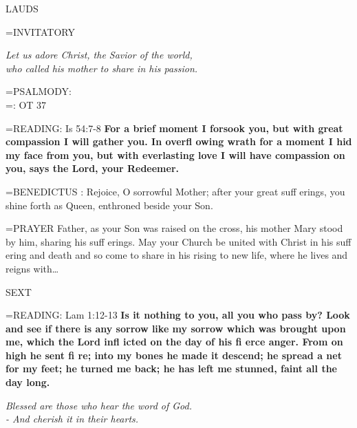 \begin{flushleft}\normalsize LAUDS\\\end{flushleft}

\hangindent=\parindent \small{INVITATORY}
\begin{center}
\textit{Let us adore Christ, the Savior of the world,\\}
\textit{who called his mother to share in his passion.\\}
\end{center}

\hangindent=\parindent \small{PSALMODY:}\\
\hangindent=\parindent : OT 37\vspace{0.5em}

\hangindent=\parindent \small{READING}: Is 54:7-8 \textbf{For a brief moment I forsook you, but with great
compassion I will gather you. In overfl owing wrath for a moment
I hid my face from you, but with everlasting love I will have
compassion on you, says the Lord, your Redeemer.\\}
 
\hangindent=\parindent \small{BENEDICTUS : Rejoice, O sorrowful Mother; after your great suff erings,
you shine forth as Queen, enthroned beside your Son.\\}
 
\hangindent=\parindent \small{PRAYER  Father, as your Son was raised on the cross, his mother Mary
stood by him, sharing his suff erings. May your Church be united
with Christ in his suff ering and death and so come to share in his
rising to new life, where he lives and reigns with…\\}
 
\begin{flushleft}\normalsize SEXT\\\end{flushleft}

\hangindent=\parindent \small{READING}: Lam 1:12-13 \textbf{Is it nothing to you, all you who pass by? Look
and see if there is any sorrow like my sorrow which was brought
upon me, which the Lord infl icted on the day of his fi erce anger.
From on high he sent fi re; into my bones he made it descend; he
spread a net for my feet; he turned me back; he has left me stunned,
faint all the day long.}
 
\begin{center}
\textit{Blessed are those who hear the word of God.\\
- And cherish it in their hearts.}
\end{center}

